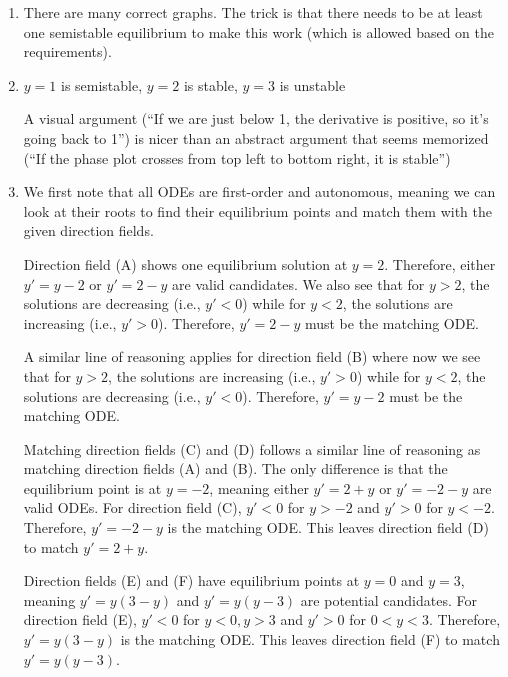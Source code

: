 \begin{enumerate}
	\item 
    There are many correct graphs. The trick is that there needs to be at least one semistable equilibrium to make this work (which is allowed based on the requirements).

    \item 
    $y=1$ is semistable,
    $y=2$ is stable,
    $y=3$ is unstable
    
    A visual argument (``If we are just below 1, the derivative is positive, so it's going back to 1'') is nicer than an abstract argument that seems memorized (``If the phase plot crosses from top left to bottom right, it is stable'')

    \item 
    We first note that all ODEs are first-order and autonomous, meaning we can look at their roots to find their equilibrium points and match them with the given direction fields. 
    
    Direction field (A) shows one equilibrium solution at $y = 2$. Therefore, either $y' = y - 2$ or $y'= 2 - y$ are valid candidates. We also see that for $y > 2$, the solutions are decreasing (i.e., $y' < 0$) while for $y < 2$, the solutions are increasing (i.e., $y' > 0$). Therefore, $y' = 2 - y$ must be the matching ODE.
    
    A similar line of reasoning applies for direction field (B) where now we see that for $y > 2$, the solutions are increasing (i.e., $y' > 0$) while for $y < 2$, the solutions are decreasing (i.e., $y' < 0$). Therefore, $y' = y - 2$ must be the matching ODE.
    
    Matching direction fields (C) and (D) follows a similar line of reasoning as matching direction fields (A) and (B). The only difference is that the equilibrium point is at $y = -2$, meaning either $y' = 2 + y$ or $y' = -2-y$ are valid ODEs. For direction field (C), $y' < 0$ for $y > -2$ and $y' > 0$ for $y < -2$. Therefore, $y' = -2 - y$ is the matching ODE. This leaves direction field (D) to match $y' = 2 + y$.
    
    Direction fields (E) and (F) have equilibrium points at $y = 0$ and $y = 3$, meaning $y' = y(3-y)$ and $y' = y(y-3)$ are potential candidates. For direction field (E), $y' < 0$ for $y < 0, y > 3$ and $y' > 0$ for $0 < y < 3$. Therefore, $y' = y(3 - y)$ is the matching ODE. This leaves direction field (F) to match $y' = y(y-3)$.
\end{enumerate}